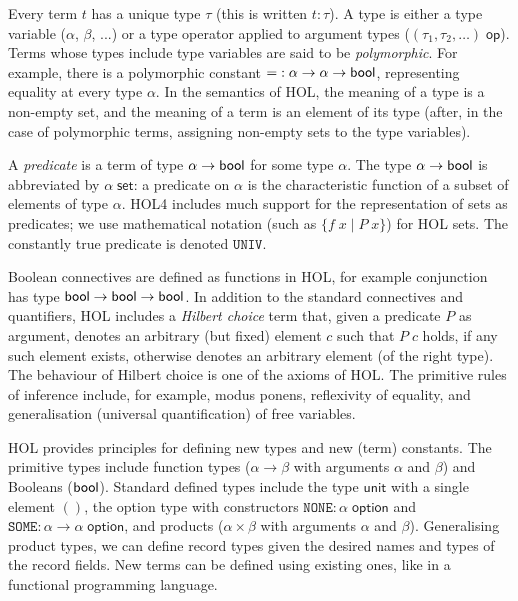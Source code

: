 \documentclass[twoside,titlepage,11pt]{article}
\begin{document}
Every term $t$ has a unique type $\tau$ (this is written $t:\tau$).
A type is either a type variable ($\alpha$, $\beta$, ...) or a type operator applied to argument types ($(\tau_1,\tau_2,\dots)\;\mathsf{op}$).
Terms whose types include type variables are said to be \emph{polymorphic}.
For example, there is a polymorphic constant $\mathtt{=}:\alpha\to\alpha\to\mathsf{bool}$, representing equality at every type $\alpha$.
In the semantics of HOL, the meaning of a type is a non-empty set, and the meaning of a term is an element of its type (after, in the case of polymorphic terms, assigning non-empty sets to the type variables).

A \emph{predicate} is a term of type $\alpha\to\mathsf{bool}$ for some type $\alpha$.
The type $\alpha\to\mathsf{bool}$ is abbreviated by $\alpha\;\mathsf{set}$: a predicate on $\alpha$ is the characteristic function of a subset of elements of type $\alpha$.
HOL4 includes much support for the representation of sets as predicates; we use mathematical notation (such as $\{f\;x\mid P\;x\}$) for HOL sets.
The constantly true predicate is denoted $\mathtt{UNIV}$.

Boolean connectives are defined as functions in HOL, for example conjunction has type $\mathsf{bool}\to\mathsf{bool}\to\mathsf{bool}$.
In addition to the standard connectives and quantifiers, HOL includes a \emph{Hilbert choice} term that, given a predicate $P$ as argument, denotes an arbitrary (but fixed) element $c$ such that $P\; c$ holds, if any such element exists, otherwise denotes an arbitrary element (of the right type).
The behaviour of Hilbert choice is one of the axioms of HOL.
The primitive rules of inference include, for example, modus ponens, reflexivity of equality, and generalisation (universal quantification) of free variables.

HOL provides principles for defining new types and new (term) constants.
The primitive types include function types ($\alpha\to\beta$ with arguments $\alpha$ and $\beta$) and Booleans ($\mathsf{bool}$).
Standard defined types include the type $\mathsf{unit}$ with a single element $()$, the option type with constructors $\mathtt{NONE}:\alpha\;\mathsf{option}$ and $\mathtt{SOME}:\alpha\to\alpha\;\mathsf{option}$, and products ($\alpha\times\beta$ with arguments $\alpha$ and $\beta$).
Generalising product types, we can define record types given the desired names and types of the record fields.
New terms can be defined using existing ones, like in a functional programming language.
\end{document}

